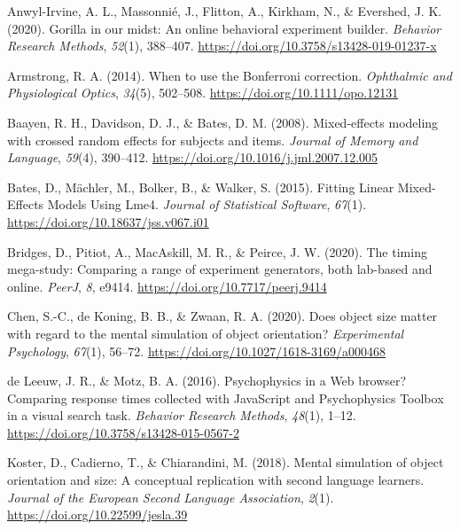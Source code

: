 \documentclass[
  man,floatsintext]{apa6}
\newlength{\cslhangindent}
\newlength{\cslentryspacingunit} %
\newenvironment{CSLReferences}[2] %
 {%
  \setlength{\parindent}{0pt}
  \ifodd #1
  \let\oldpar\par
  \def\par{\hangindent=\cslhangindent\oldpar}
  \fi
  \setlength{\parskip}{#2\cslentryspacingunit}
 }%
 {}
\begin{document}
\hypertarget{refs}{}
\begin{CSLReferences}{1}{0}
\leavevmode{}%
Anwyl-Irvine, A. L., Massonnié, J., Flitton, A., Kirkham, N., \& Evershed, J. K. (2020). Gorilla in our midst: {An} online behavioral experiment builder. \emph{Behavior Research Methods}, \emph{52}(1), 388--407. \url{https://doi.org/10.3758/s13428-019-01237-x}

\leavevmode{}%
Armstrong, R. A. (2014). When to use the {Bonferroni} correction. \emph{Ophthalmic and Physiological Optics}, \emph{34}(5), 502--508. \url{https://doi.org/10.1111/opo.12131}

\leavevmode{}%
Baayen, R. H., Davidson, D. J., \& Bates, D. M. (2008). Mixed-effects modeling with crossed random effects for subjects and items. \emph{Journal of Memory and Language}, \emph{59}(4), 390--412. \url{https://doi.org/10.1016/j.jml.2007.12.005}

\leavevmode{}%
Bates, D., Mächler, M., Bolker, B., \& Walker, S. (2015). Fitting {Linear Mixed}-{Effects Models Using} Lme4. \emph{Journal of Statistical Software}, \emph{67}(1). \url{https://doi.org/10.18637/jss.v067.i01}

\leavevmode{}%
Bridges, D., Pitiot, A., MacAskill, M. R., \& Peirce, J. W. (2020). The timing mega-study: Comparing a range of experiment generators, both lab-based and online. \emph{PeerJ}, \emph{8}, e9414. \url{https://doi.org/10.7717/peerj.9414}

\leavevmode{}%
Chen, S.-C., de Koning, B. B., \& Zwaan, R. A. (2020). Does object size matter with regard to the mental simulation of object orientation? \emph{Experimental Psychology}, \emph{67}(1), 56--72. \url{https://doi.org/10.1027/1618-3169/a000468}

\leavevmode{}%
de Leeuw, J. R., \& Motz, B. A. (2016). Psychophysics in a {Web} browser? {Comparing} response times collected with {JavaScript} and {Psychophysics Toolbox} in a visual search task. \emph{Behavior Research Methods}, \emph{48}(1), 1--12. \url{https://doi.org/10.3758/s13428-015-0567-2}

\leavevmode{}%
Koster, D., Cadierno, T., \& Chiarandini, M. (2018). Mental simulation of object orientation and size: {A} conceptual replication with second language learners. \emph{Journal of the European Second Language Association}, \emph{2}(1). \url{https://doi.org/10.22599/jesla.39}


\end{CSLReferences}
\end{document}
